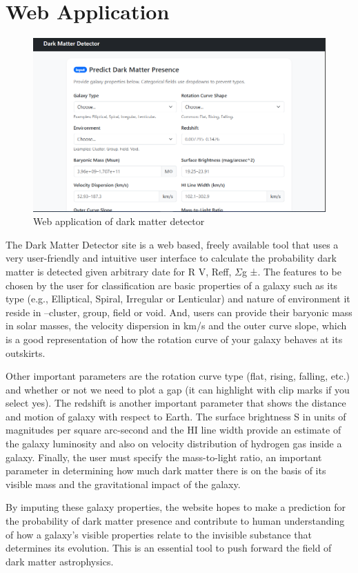 \section{Web Application}
\begin{figure}
    \centering
    \includegraphics[width=0.5\linewidth]{Chap4/web-application.png}
    \caption{Web application of dark matter detector}
    \label{fig:placeholder}
\end{figure}
The Dark Matter Detector site is a web based, freely available tool that uses a very user-friendly and intuitive user interface to calculate the probability dark matter is detected given arbitrary date for R V, Reff, $\Sigma$g ±. The features to be chosen by the user for classification are basic properties of a galaxy such as its type (e.g., Elliptical, Spiral, Irregular or Lenticular) and nature of environment it reside in –cluster, group, field or void. And, users can provide their baryonic mass in solar masses, the velocity dispersion in km/s and the outer curve slope, which is a good representation of how the rotation curve of your galaxy behaves at its outskirts.

Other important parameters are the rotation curve type (flat, rising, falling, etc.) and whether or not we need to plot a gap (it can highlight with clip marks if you select yes). The redshift is another important parameter that shows the distance and motion of galaxy with respect to Earth. The surface brightness S in units of magnitudes per square arc-second and the HI line width provide an estimate of the galaxy luminosity and also on velocity distribution of hydrogen gas inside a galaxy. Finally, the user must specify the mass-to-light ratio, an important parameter in determining how much dark matter there is on the basis of its visible mass and the gravitational impact of the galaxy.

By imputing these galaxy properties, the website hopes to make a prediction for the probability of dark matter presence and contribute to human understanding of how a galaxy’s visible properties relate to the invisible substance that determines its evolution. This is an essential tool to push forward the field of dark matter astrophysics.

